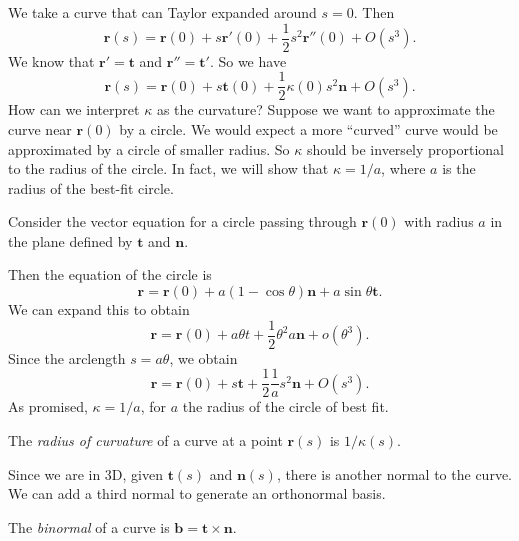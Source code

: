 \documentclass[a4paper]{article}
\begin{document}
We take a curve that can Taylor expanded around $s = 0$. Then
\[
  \mathbf{r}(s) = \mathbf{r}(0) + s\mathbf{r}'(0) + \frac{1}{2}s^2 \mathbf{r}''(0) + O(s^3).
\]
We know that $\mathbf{r}' = \mathbf{t}$ and $\mathbf{r}'' = \mathbf{t}'$. So we have
\[
  \mathbf{r}(s) = \mathbf{r}(0) + s\mathbf{t}(0) + \frac{1}{2}\kappa(0) s^2 \mathbf{n} + O(s^3).
\]
How can we interpret $\kappa$ as the curvature? Suppose we want to approximate the curve near $\mathbf{r}(0)$ by a circle. We would expect a more ``curved'' curve would be approximated by a circle of smaller radius. So $\kappa$ should be inversely proportional to the radius of the circle. In fact, we will show that $\kappa = 1/a$, where $a$ is the radius of the best-fit circle.

Consider the vector equation for a circle passing through $\mathbf{r}(0)$ with radius $a$ in the plane defined by $\mathbf{t}$ and $\mathbf{n}$.

\begin{center}
\end{center}
Then the equation of the circle is
\[
  \mathbf{r} = \mathbf{r}(0) + a(1 - \cos \theta) \mathbf{n} + a\sin \theta \mathbf{t}.
\]
We can expand this to obtain
\[
  \mathbf{r} = \mathbf{r}(0) + a\theta t + \frac{1}{2}\theta^2 a\mathbf{n} + o(\theta^3).
\]
Since the arclength $s = a\theta$, we obtain
\[
  \mathbf{r} = \mathbf{r}(0) + s\mathbf{t} + \frac{1}{2}\frac{1}{a}s^2\mathbf{n} + O(s^3).
\]
As promised, $\kappa = 1/a$, for $a$ the radius of the circle of best fit.

\begin{defi}
  The \emph{radius of curvature} of a curve at a point $\mathbf{r}(s)$ is $1/\kappa(s)$.
\end{defi}
Since we are in 3D, given $\mathbf{t}(s)$ and $\mathbf{n}(s)$, there is another normal to the curve. We can add a third normal to generate an orthonormal basis.
\begin{defi}[Binormal]
  The \emph{binormal} of a curve is $\mathbf{b} = \mathbf{t}\times \mathbf{n}$.
\end{defi}
\end{document}
